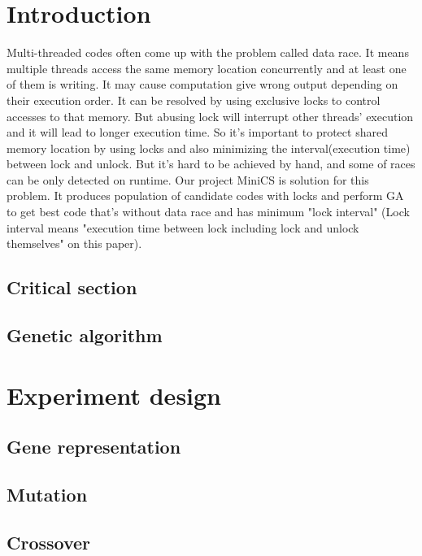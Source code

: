 \documentclass[sigconf]{acmart}
\begin{document}
\section{Introduction}
Multi-threaded codes often come up with the problem called data race. It means multiple threads access the same memory location concurrently and at least one of them is writing. It may cause computation give wrong output depending on their execution order. It can be resolved by using exclusive locks to control accesses to that memory. But abusing lock will interrupt other threads' execution and it will lead to longer execution time.
So it's important to protect shared memory location by using locks and also minimizing the interval(execution time) between lock and unlock. But it's hard to be achieved by hand, and some of races can be only detected on runtime.
Our project MiniCS is solution for this problem. It produces population of candidate codes with locks and perform GA to get best code that's without data race and has minimum "lock interval" (Lock interval means "execution time between lock including lock and unlock themselves" on this paper).



\subsection{Critical section}

\subsection{Genetic algorithm}

\section{Experiment design}



\subsection{Gene representation}



\subsection{Mutation}

\subsection{Crossover}
\end{document}
